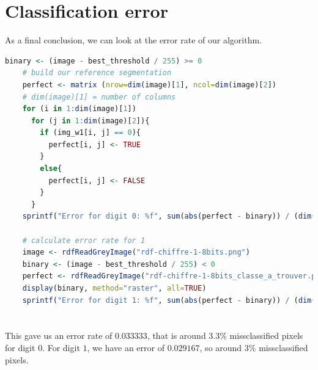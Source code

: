 \section{Classification error}
As a final conclusion, we can look at the error rate of our algorithm.

\begin{lstlisting}[language=R, caption=Calculating error rate]
    binary <- (image - best_threshold / 255) >= 0
    # build our reference segmentation
    perfect <- matrix (nrow=dim(image)[1], ncol=dim(image)[2])
    # dim(image)[1] = number of columns
    for (i in 1:dim(image)[1])
      for (j in 1:dim(image)[2]){
        if (img_w1[i, j] == 0){
          perfect[i, j] <- TRUE
        }
        else{
          perfect[i, j] <- FALSE
        }
      }
    sprintf("Error for digit 0: %f", sum(abs(perfect - binary)) / (dim(perfect)[1] * dim(perfect)[2]))
    
    # calculate error rate for 1
    image <- rdfReadGreyImage("rdf-chiffre-1-8bits.png")
    binary <- (image - best_threshold / 255) < 0
    perfect <- rdfReadGreyImage("rdf-chiffre-1-8bits_classe_a_trouver.png")
    display(binary, method="raster", all=TRUE)
    sprintf("Error for digit 1: %f", sum(abs(perfect - binary)) / (dim(perfect)[1] * dim(perfect)[2]))
    
\end{lstlisting}

\paragraph{}
This gave us an error rate of $0.033333$, that is around $3.3\%$ missclassified pixels for digit $0$.
For digit $1$, we have an error of $0.029167$, so around $3\%$ missclassified pixels.

